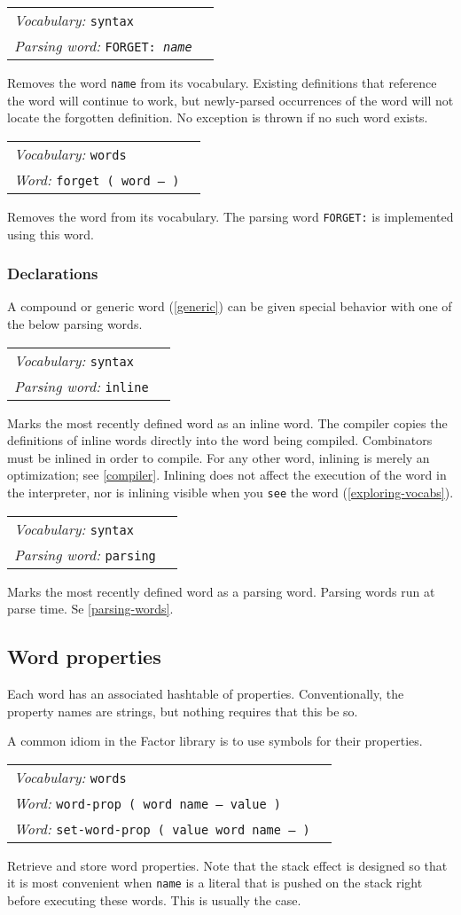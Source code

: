 \documentclass{book}
\newcommand{\vocabulary}[1]{\emph{Vocabulary:} \texttt{#1}&\\}
\newcommand{\parsingword}[2]{\index{\texttt{#1}}\emph{Parsing word:} \texttt{#2}&\\}
\newcommand{\ordinaryword}[2]{\index{\texttt{#1}}\emph{Word:} \texttt{#2}&\\}
\newcommand{\wordtable}[1]{


\begin{tabularx}{12cm}{lX}
\hline
#1
\hline
\end{tabularx}

}
\begin{document}
\wordtable{
\vocabulary{syntax}
\parsingword{FORGET:}{FORGET:~\emph{name}}
}
Removes the word \texttt{name} from its vocabulary. Existing definitions that reference the word will continue to work, but newly-parsed occurrences of the word will not locate the forgotten definition. No exception is thrown if no such word exists.
\wordtable{
\vocabulary{words}
\ordinaryword{forget}{forget ( word -- )}

}
Removes the word from its vocabulary. The parsing word \texttt{FORGET:} is implemented using this word.

\subsubsection{\label{declarations}Declarations}

A compound or generic word (\ref{generic}) can be given special behavior with one of the below parsing words.

\wordtable{
\vocabulary{syntax}
\parsingword{inline}{inline}
}
Marks the most recently defined word as an inline word. The compiler copies the definitions of inline words directly into the word being compiled. Combinators must be inlined in order to compile. For any other word, inlining is merely an optimization; see \ref{compiler}. Inlining does not affect the execution of the word in the interpreter, nor is inlining visible when you \texttt{see} the word (\ref{exploring-vocabs}).

\wordtable{
\vocabulary{syntax}
\parsingword{parsing}{parsing}
}
Marks the most recently defined word as a parsing word. Parsing words run at parse time. Se \ref{parsing-words}.

\subsection{\label{word-props}Word properties}


Each word has an associated hashtable of properties. Conventionally, the property names are strings, but nothing requires that this be so.

A common idiom in the Factor library is to use symbols for their properties. 

\wordtable{
\vocabulary{words}
\ordinaryword{word-prop}{word-prop ( word name -- value )}
\ordinaryword{set-word-prop}{set-word-prop ( value word name -- )}

}
Retrieve and store word properties. Note that the stack effect is designed so that it is most convenient when \texttt{name} is a literal that is pushed on the stack right before executing these words. This is usually the case.
\end{document}

